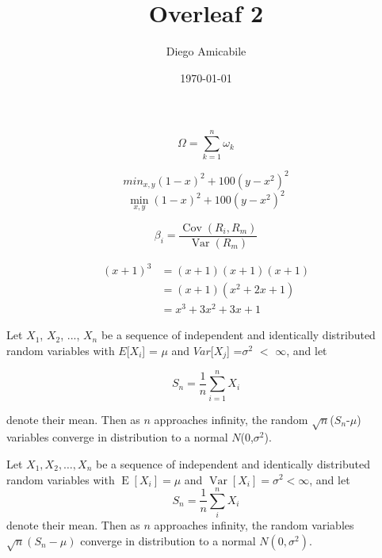 \documentclass[a4paper,12pt]{article}
\begin{document}
\title{Overleaf 2}
\author{Diego Amicabile}
\date{\today}
\maketitle

\begin{equation*}
\Omega = \sum_{k=1}^{n} \omega_k
\end{equation*}

\begin{equation*}
min_{x,y} (1-x)^2 + 100(y-x^2)^2
\end{equation*}
\begin{equation*}
\min_{x,y}{(1-x)^2 + 100(y-x^2)^2}
\end{equation*}

\begin{equation*}
\beta_i =
\frac{\operatorname{Cov}(R_i, R_m)}
{\operatorname{Var}(R_m)}
\end{equation*}

\begin{align*}
(x+1)^3 &= (x+1)(x+1)(x+1) \\
&= (x+1)(x^2 + 2x + 1) \\
&= x^3 + 3x^2 + 3x + 1
\end{align*}

Let $X_1$, $X_2$, ..., $X_n$
be a sequence of independent and identically
distributed random variables with $E$[$X_i$] = $\mu$
and $Var$[$X_j$] =$\sigma^2$ $<$ $\infty$, and let

\begin{equation*}
S_n = \frac{1}{n}{\sum_{i=1}^{n} X_i}
\end{equation*}

denote their mean. Then as $n$ approaches infinity, the random $\sqrt{n}$($S_n$-$\mu$) variables converge in distribution to a normal $N$(0,$\sigma^2$).


Let $X_1, X_2, \ldots, X_n$ be a sequence of independent and
identically distributed random variables with
$\operatorname{E}[X_i] = \mu$ and
$\operatorname{Var}[X_i] = \sigma^2 < \infty$, and let
\begin{equation*}
S_n = \frac{1}{n}\sum_{i}^{n} X_i
\end{equation*}
denote their mean. Then as $n$ approaches infinity, the
random variables $\sqrt{n}(S_n - \mu)$ converge in
distribution to a normal $N(0, \sigma^2)$.

\end{document}
